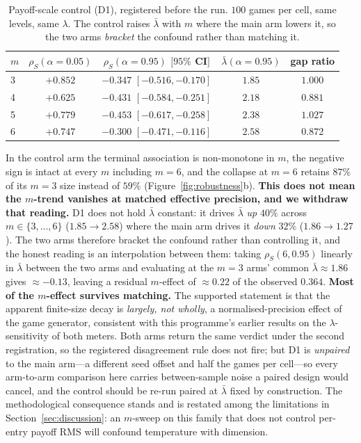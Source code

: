 \begin{table}[H]
\caption{Payoff-scale control (D1), registered before the run. $100$ games per
cell, same levels, same $\lambda$. The control raises $\bar\lambda$ with $m$ where the main
arm lowers it, so the two arms \emph{bracket} the confound rather than matching it.}
\label{tab:d1}
\small
\begin{tabular}{lcccc}
\toprule
$m$ & $\rho_S(\alpha{=}0.05)$ & $\rho_S(\alpha{=}0.95)$ $[95\%$ CI$]$ & $\bar\lambda(\alpha{=}0.95)$ & gap ratio \\
\midrule
3 & $+0.852$ & $-0.347$ $[-0.516,-0.170]$ & $1.85$ & $1.000$ \\
4 & $+0.625$ & $-0.431$ $[-0.584,-0.251]$ & $2.18$ & $0.881$ \\
5 & $+0.779$ & $-0.453$ $[-0.617,-0.258]$ & $2.38$ & $1.027$ \\
6 & $+0.747$ & $-0.300$ $[-0.471,-0.116]$ & $2.58$ & $0.872$ \\
\bottomrule
\end{tabular}
\end{table}

\noindent In the control arm the terminal association is non-monotone in $m$, the negative
sign is intact at every $m$ including $m=6$, and the collapse at $m=6$ retains $87\%$ of its
$m=3$ size instead of $59\%$ (Figure~\ref{fig:robustness}b). \textbf{This does not mean the
$m$-trend vanishes at matched effective precision, and we withdraw that reading.} D1 does
not hold $\bar\lambda$ constant: it drives $\bar\lambda$ \emph{up} $40\%$ across
$m\in\{3,\dots,6\}$ ($1.85\to2.58$) where the main arm drives it \emph{down} $32\%$
($1.86\to1.27$). The two arms therefore bracket the confound rather than controlling it, and
the honest reading is an interpolation between them: taking $\rho_S(6,0.95)$ linearly in
$\bar\lambda$ between the two arms and evaluating at the $m=3$ arms' common
$\bar\lambda\approx1.86$ gives $\approx-0.13$, leaving a residual $m$-effect of $\approx0.22$
of the observed $0.364$. \textbf{Most of the $m$-effect survives matching.} The supported
statement is that the apparent finite-size decay is \emph{largely, not wholly}, a
normalised-precision effect of the game generator, consistent with this programme's earlier
results on the $\lambda$-sensitivity of both meters. Both arms return the same verdict under
the second registration, so the registered disagreement rule does not fire; but D1 is
\emph{unpaired} to the main arm---a different seed offset and half the games per cell---so
every arm-to-arm comparison here carries between-sample noise a paired design would cancel,
and the control should be re-run paired at $\bar\lambda$ fixed by construction. The
methodological consequence stands and is restated among the limitations in
Section~\ref{sec:discussion}: an $m$-sweep on this family that does not control per-entry
payoff RMS will confound temperature with dimension.

